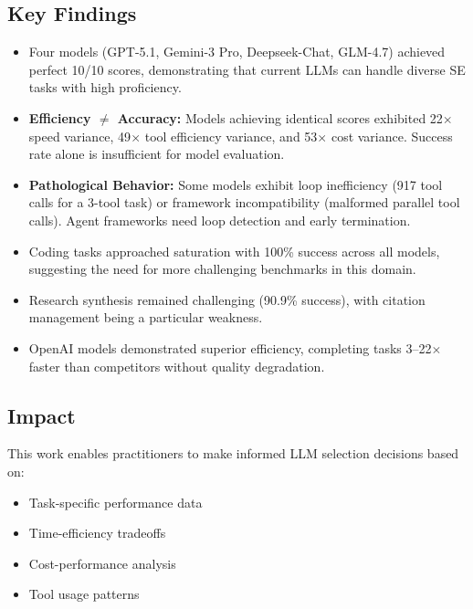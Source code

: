 \subsection{Key Findings}

\begin{itemize}
    \item Four models (GPT-5.1, Gemini-3 Pro, Deepseek-Chat, GLM-4.7) achieved perfect 10/10 scores, demonstrating that current LLMs can handle diverse SE tasks with high proficiency.

    \item \textbf{Efficiency $\neq$ Accuracy:} Models achieving identical scores exhibited 22$\times$ speed variance, 49$\times$ tool efficiency variance, and 53$\times$ cost variance. Success rate alone is insufficient for model evaluation.

    \item \textbf{Pathological Behavior:} Some models exhibit loop inefficiency (917 tool calls for a 3-tool task) or framework incompatibility (malformed parallel tool calls). Agent frameworks need loop detection and early termination.

    \item Coding tasks approached saturation with 100\% success across all models, suggesting the need for more challenging benchmarks in this domain.

    \item Research synthesis remained challenging (90.9\% success), with citation management being a particular weakness.

    \item OpenAI models demonstrated superior efficiency, completing tasks 3--22$\times$ faster than competitors without quality degradation.
\end{itemize}

\subsection{Impact}

This work enables practitioners to make informed LLM selection decisions based on:
\begin{itemize}
    \item Task-specific performance data
    \item Time-efficiency tradeoffs
    \item Cost-performance analysis
    \item Tool usage patterns
\end{itemize}


